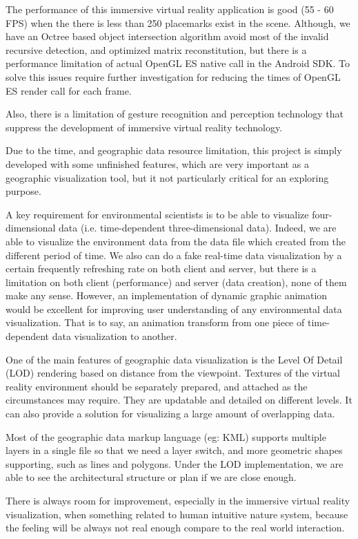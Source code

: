 The performance of this immersive virtual reality application is good (55 - 60 FPS) when the there is less than 250 placemarks exist in the scene. Although, we have an Octree based object intersection algorithm avoid most of the invalid recursive detection, and optimized matrix reconstitution, but there is a performance limitation of actual OpenGL ES native call in the Android SDK. To solve this issues require further investigation for reducing the times of OpenGL ES render call for each frame. 

Also, there is a limitation of gesture recognition and perception technology that suppress the development of immersive virtual reality technology.

Due to the time, and geographic data resource limitation, this project is simply developed with some unfinished features, which are very important as a geographic visualization tool, but it not particularly critical for an exploring purpose.

A key requirement for environmental scientists is to be able to visualize four-dimensional data (i.e. time-dependent three-dimensional data). Indeed, we are able to visualize the environment data from the data file which created from the different period of time. We also can do a fake real-time data visualization by a certain frequently refreshing rate on both client and server, but there is a limitation on both client (performance) and server (data creation), none of them make any sense. However, an implementation of dynamic graphic animation would be excellent for improving user understanding of any environmental data visualization. That is to say, an animation transform from one piece of time-dependent data visualization to another.

One of the main features of geographic data visualization is the Level Of Detail (LOD) rendering based on distance from the viewpoint. Textures of the virtual reality environment should be separately prepared, and attached as the circumstances may require. They are updatable and detailed on different levels. It can also provide a solution for visualizing a large amount of overlapping data.

Most of the geographic data markup language (eg: KML) supports multiple layers in a single file so that we need a layer switch, and more geometric shapes supporting, such as lines and polygons. Under the LOD implementation, we are able to see the architectural structure or plan if we are close enough.

There is always room for improvement, especially in the immersive virtual reality visualization, when something related to human intuitive nature system, because the feeling will be always not real enough compare to the real world interaction.


